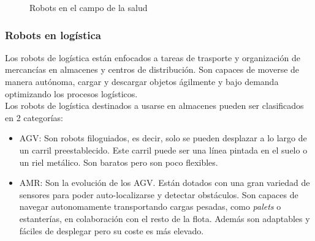 \begin{figure} [ht!]
  \centering    
  \hspace{1cm}
  \hspace{1cm}
  \caption{Robots en el campo de la salud}
\end{figure}


\subsubsection{Robots en logística}
Los robots de logística están enfocados a tareas de trasporte y organización de mercancías en almacenes y centros de distribución. 
Son capaces de moverse de manera autónoma, cargar y descargar objetos ágilmente y bajo demanda optimizando los procesos logísticos. 
\\Los robots de logística destinados a usarse en almacenes pueden ser clasificados en 2 categorías:
\begin{itemize}
\item \ac{AGV}: Son robots filoguiados, es decir, solo se pueden desplazar a lo largo de un carril preestablecido. Este carril puede ser 
una línea pintada en el suelo o un riel metálico. Son baratos pero son poco flexibles.
\item \ac{AMR}: Son la evolución de los \acs{AGV}. Están dotados con una gran variedad de sensores para poder auto-localizarse y 
detectar obstáculos. Son capaces de navegar autonomamente transportando cargas pesadas, como \textit{palets} o estanterías, en colaboración 
con el resto de la flota. Además son adaptables y fáciles de desplegar pero su coste es más elevado.
\end{itemize}

